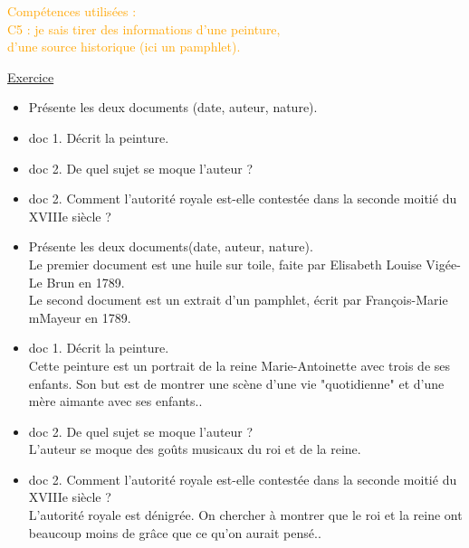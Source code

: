 \documentclass{beamer}
\begin{document}
\begin{frame}
\begin{flushright}
{\tiny \textcolor{orange}{Compétences utilisées : \\
C5 : je sais tirer des informations d'une peinture, \\d'une source historique (ici un pamphlet).\\}}
\end{flushright}
\underline{Exercice}
\begin{itemize}
\item Présente les deux documents (date, auteur, nature).
\item doc 1. Décrit la peinture. 
\item doc 2. De quel sujet se moque l'auteur ?
\item doc 2. Comment l'autorité royale est-elle contestée dans la seconde moitié du XVIIIe siècle ?
\end{itemize}
\end{frame}

\begin{frame}
\begin{itemize}
\item Présente les deux documents(date, auteur, nature).\\
\pause \textcolor{black!70!green}{Le premier document est une huile sur toile, faite par Elisabeth Louise Vigée-Le Brun en 1789. \\ Le second document est un extrait d'un pamphlet, écrit par François-Marie mMayeur en 1789.}
\vfill
\item doc 1. Décrit la peinture. \\
\pause \textcolor{black!70!green}{Cette peinture est un portrait de la reine Marie-Antoinette avec trois de ses enfants. Son but est de montrer une scène d'une vie "quotidienne" et d'une mère aimante avec ses enfants.}.
\end{itemize}
\end{frame}

\begin{frame}
\begin{itemize}
\item doc 2. De quel sujet se moque l'auteur ? \\
\pause \textcolor{black!70!green}{L'auteur se moque des goûts musicaux du roi et de la reine.}
\vfill
\item doc 2. Comment l'autorité royale est-elle contestée dans la seconde moitié du XVIIIe siècle ? \\
\pause \textcolor{black!70!green}{L'autorité royale est dénigrée. On chercher à montrer que le roi et la reine ont beaucoup moins de grâce que ce qu'on aurait pensé.}.
\end{itemize}
\end{frame}
\end{document}
